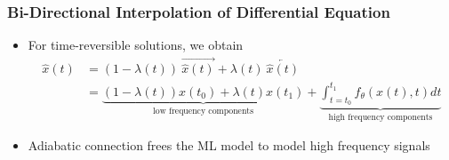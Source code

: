 \documentclass[usenames, dvipsnames, t]{beamer}
\begin{document}
\begin{frame}
	\frametitle{Bi-Directional Interpolation of Differential Equation}
	\begin{itemize}
		\item For time-reversible solutions, we obtain
		\begin{align*}
			\hat{x}(t) &= (1-\lambda(t)) \ \overrightarrow{\hat{x}(t)} + \lambda(t) \ \overleftarrow{\hat{x}(t)} \\
			&= \underbrace{(1-\lambda(t)) x(t_0) + \lambda(t) x(t_1)}_{\text{low frequency components}} + \underbrace{\int_{t=t_0}^{t_1} f_\theta \left(x(t), t \right) dt }_{\text{high frequency components}}
		\end{align*}
		\item<+-> Adiabatic connection frees the ML model to model high frequency signals
	\end{itemize}
	\begin{figure}[!htbp]
		\begin{adjustbox}{max width = 0.3\textwidth, height = 0.3\textheight}
		\end{adjustbox}
		\end{figure}
\end{frame}
\end{document}
